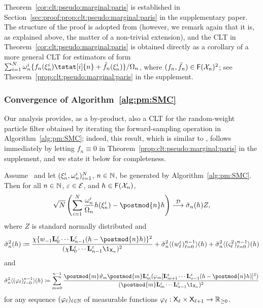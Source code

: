 Theorem~\ref{cor:clt:pseudo:marginal:paris} is established in Section~\ref{sec:proof:prop:clt:pseudo:marginal:paris} in the supplementary paper. The structure of the proof is adopted from \cite{olsson:westerborn:2017} (however, we remark again that it is, as explained above, the matter of a non-trivial extension), and the CLT in Theorem~\ref{cor:clt:pseudo:marginal:paris} is obtained directly as a corollary of a more general CLT for estimators of form $\sum_{i = 1}^\N \ewght{n}{i} \{ f_n(\epart{n}{i}) \tstat[i]{n} + \ftd{n}(\epart{n}{i}) \} / \sumwght{n}$, where $(f_n, \tilde{f}_{n}) \in \mathsf{F}(\mathcal{X}_n)^2$; see Theorem~\ref{prop:clt:pseudo:marginal:paris} in the supplement.  

\subsubsection{Convergence of Algorithm~\ref{alg:pm:SMC}} 
\label{sec:implied:convergence:results}

Our analysis provides, as a by-product, also a CLT for the random-weight particle filter obtained by iterating the forward-sampling operation in Algorithm~\ref{alg:pm:SMC}; indeed, this result, which is similar to \cite[Theorem~3]{fearnhead2008particle}, follows immediately by letting $f_n \equiv 0$ in Theorem~\ref{prop:clt:pseudo:marginal:paris} in the supplement, and we state it below for completeness. 

\begin{proposition} \label{prop:clt:pseudo:marginal:filter}
Assume~ and let $(\xi_{n}^{i}, \omega_{n}^{i})_{i = 1}^N$, $n \in \mathbb{N}$, be generated by Algorithm~\ref{alg:pm:SMC}. Then for all $n \in \mathbb{N}$, $\varepsilon \in \mathcal{E}$, and $h \in \mathsf{F}(\mathcal{X}_n)$, 
$$
 \sqrt{\N} \left( \sum_{i = 1}^\N \frac{\ewght{n}{i}}{\sumwght{n}} h(\epart{n}{i}) - \postmod{n} h \right) 
  \dlim \tilde{\sigma}_n(h) Z, 
$$
where $Z$ is standard normally distributed and
\begin{equation} \label{eq:as:var:pm:filter}
\tilde{\sigma}^2_n(h) \eqdef \frac{\chi\{ \initwgtfunc \ukmod{0} \cdots \ukmod{n - 1}(h - \postmod{n} h) \}^2}{(\chi \ukmod{0} \cdots \ukmod{n - 1} \1_{\Xset_n})^2} + \tilde{\sigma}^2_n \langle (\wgtfuncmod{\ell})_{\ell = 0}^{n - 1} \rangle (h) + \tilde{\sigma}^2_n \langle (\ukestvar{\ell})_{\ell = 0}^{n - 1} \rangle (h) 
\end{equation}
and
\begin{equation} \label{eq:non-recursive:filter:as:var}
\tilde{\sigma}^2_n \langle (\varphi_\ell)_{\ell = 0}^{n - 1} \rangle (h) 
\eqdef \sum_{m = 0}^{n - 1} \frac{\postmod{m} \adjfuncforward{m} \postmod{m} \ukmod{m}(\varphi_m [\ukmod{m + 1} \cdots \ukmod{n - 1} (h - \postmod{n} h)
]^2)}{(\postmod{m} \ukmod{m} \cdots \ukmod{n - 1} \1_{\Xset_n})^2} 
\end{equation}
for any sequence $(\varphi_\ell)_{\ell \in \mathbb{N}}$ of measurable functions $\varphi_\ell : \mathsf{X}_\ell \times \mathsf{X}_{\ell + 1} \to \mathbb{R}_{\geq 0}$. 
\end{proposition}

